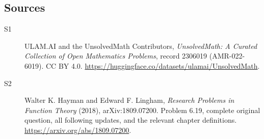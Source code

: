 \documentclass[11pt]{book}
\begin{document}
\subsection{Sources}
\begin{description}
\item[\hypertarget{source:2306019:1}{S1}] ULAM.AI and the UnsolvedMath Contributors, \emph{UnsolvedMath: A Curated Collection of Open Mathematics Problems}, record 2306019 (AMR-022-6019). CC BY 4.0. \url{https://huggingface.co/datasets/ulamai/UnsolvedMath}.
\item[\hypertarget{source:2306019:2}{S2}] Walter K. Hayman and Edward F. Lingham, \emph{Research Problems in Function Theory} (2018), arXiv:1809.07200. Problem 6.19, complete original question, all following updates, and the relevant chapter definitions. \url{https://arxiv.org/abs/1809.07200}.
\end{description}
\label{end:2306019}
\end{document}
